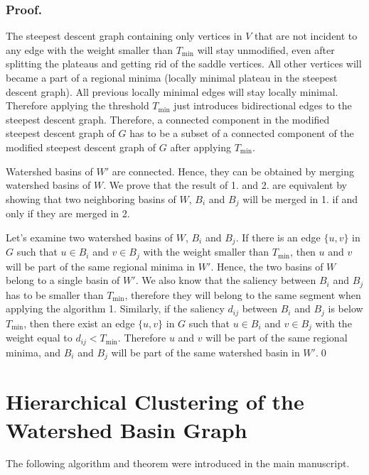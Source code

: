 \documentclass{llncs}
\begin{document}
\subsubsection{Proof.} The steepest descent graph containing only vertices in $V$ that are not incident to any edge with the weight smaller than $T_{\min}$ will stay unmodified, even after splitting the plateaus and getting rid of the saddle vertices. All other vertices will became a part of a regional minima (locally minimal plateau in the steepest descent graph). All previous locally minimal edges will stay locally minimal. Therefore applying the threshold $T_{\min}$ just introduces bidirectional edges to the steepest descent graph. Therefore, a connected component in the modified steepest descent graph of $G$ has to be a subset of a connected component of the modified steepest descent graph of $G$ after applying $T_{\min}$.

Watershed basins of $W'$ are connected. Hence, they can be obtained by merging watershed basins of $W$. We prove that the result of 1. and 2. are equivalent by showing that two neighboring basins of $W$, $B_i$ and $B_j$ will be merged in 1. if and only if they are merged in 2.

Let's examine two watershed basins of $W$, $B_i$ and $B_j$. If there is an edge $\{u,v\}$ in $G$ such that $u \in B_i$ and $v \in B_j$ with the weight smaller than $T_{\min}$, then $u$ and $v$ will be part of the same regional minima in $W'$. Hence, the two basins of $W$ belong to a single basin of $W'$. We also know that the saliency between $B_i$ and $B_j$ has to be smaller than $T_{\min}$, therefore they will belong to the same segment when applying the algorithm 1. Similarly, if the saliency $d_{ij}$ between $B_i$ and $B_j$ is below $T_{\min}$, then there exist an edge $\{u,v\}$ in $G$ such that $u \in B_i$ and $v \in B_j$ with the weight equal to $d_{ij} < T_{\min}$. Therefore $u$ and $v$ will be part of the same regional minima, and $B_i$ and $B_j$ will be part of the same watershed basin in $W'$.\qed


\section{Hierarchical Clustering of the Watershed Basin Graph}\label{sec:Others}

The following algorithm and theorem were introduced in the main manuscript.
\end{document}
